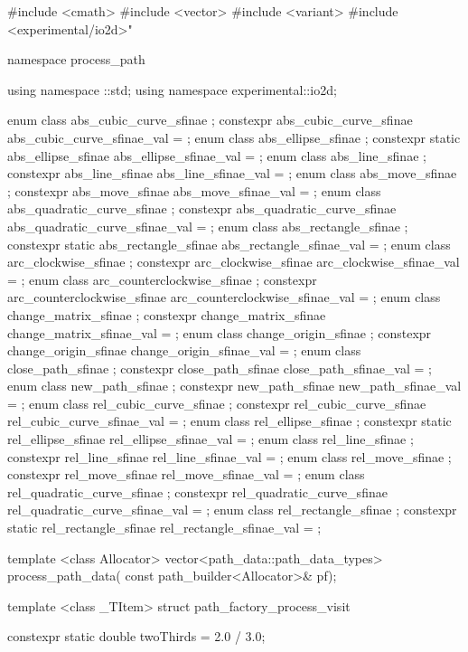 
\begin{codeblock}
  #include <cmath>
  #include <vector>
  #include <variant>
  #include <experimental/io2d>"
  
  namespace process_path {
    using namespace ::std;
    using namespace experimental::io2d;
  
    enum class abs_cubic_curve_sfinae {};
    constexpr abs_cubic_curve_sfinae abs_cubic_curve_sfinae_val = {};
    enum class abs_ellipse_sfinae {};
    constexpr static abs_ellipse_sfinae abs_ellipse_sfinae_val = {};
    enum class abs_line_sfinae {};
    constexpr abs_line_sfinae abs_line_sfinae_val = {};
    enum class abs_move_sfinae {};
    constexpr abs_move_sfinae abs_move_sfinae_val = {};
    enum class abs_quadratic_curve_sfinae {};
    constexpr abs_quadratic_curve_sfinae abs_quadratic_curve_sfinae_val = {};
    enum class abs_rectangle_sfinae {};
    constexpr static abs_rectangle_sfinae abs_rectangle_sfinae_val = {};
    enum class arc_clockwise_sfinae {};
    constexpr arc_clockwise_sfinae arc_clockwise_sfinae_val = {};
    enum class arc_counterclockwise_sfinae {};
    constexpr arc_counterclockwise_sfinae arc_counterclockwise_sfinae_val = {};
    enum class change_matrix_sfinae {};
    constexpr change_matrix_sfinae change_matrix_sfinae_val = {};
    enum class change_origin_sfinae {};
    constexpr change_origin_sfinae change_origin_sfinae_val = {};
    enum class close_path_sfinae {};
    constexpr close_path_sfinae close_path_sfinae_val = {};
    enum class new_path_sfinae {};
    constexpr new_path_sfinae new_path_sfinae_val = {};
    enum class rel_cubic_curve_sfinae {};
    constexpr rel_cubic_curve_sfinae rel_cubic_curve_sfinae_val = {};
    enum class rel_ellipse_sfinae {};
    constexpr static rel_ellipse_sfinae rel_ellipse_sfinae_val = {};
    enum class rel_line_sfinae {};
    constexpr rel_line_sfinae rel_line_sfinae_val = {};
    enum class rel_move_sfinae {};
    constexpr rel_move_sfinae rel_move_sfinae_val = {};
    enum class rel_quadratic_curve_sfinae {};
    constexpr rel_quadratic_curve_sfinae rel_quadratic_curve_sfinae_val = {};
    enum class rel_rectangle_sfinae {};
    constexpr static rel_rectangle_sfinae rel_rectangle_sfinae_val = {};

    template <class Allocator>
    vector<path_data::path_data_types> process_path_data(
      const path_builder<Allocator>& pf);

    template <class _TItem>
    struct path_factory_process_visit {
      constexpr static double twoThirds = 2.0 / 3.0;

}}
\end{codeblock}
